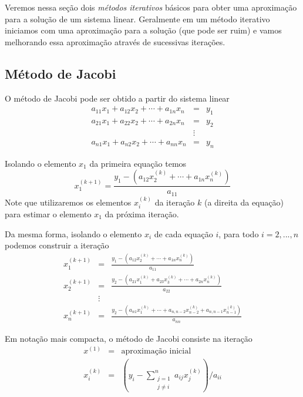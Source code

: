 Veremos nessa seção dois \emph{métodos iterativos} básicos para obter uma aproximação para a solução de um sistema linear. Geralmente em um método iterativo iniciamos com uma aproximação para a solução (que pode ser ruim) e vamos melhorando essa aproximação através de sucessivas iterações.




\subsection{Método de Jacobi}
O método de Jacobi pode ser obtido a partir do sistema linear
\begin{eqnarray*}
a_{11}x_1+a_{12}x_2+\cdots+a_{1n}x_n&=&y_1\\
a_{21}x_1+a_{22}x_2+\cdots+a_{2n}x_n&=&y_2\\
&\vdots&     \\
a_{n1}x_1+a_{n2}x_2+\cdots+a_{nn}x_n&=& y_n
\end{eqnarray*}

Isolando o elemento $x_1$ da primeira equação temos
\begin{equation}
x_1^{(k+1)}= \frac{y_1 - \left(a_{12}x_2^{(k)}+\cdots+a_{1n}x_n^{(k)}\right)}{a_{11}} 
\end{equation}
Note que utilizaremos os elementos $x_i^{(k)}$ da iteração $k$ (a direita da equação) para estimar o elemento $x_1$ da próxima iteração. 

Da mesma forma, isolando o elemento $x_i$ de cada equação $i$, para todo $i=2,...,n$ podemos construir a iteração
\begin{eqnarray*}
x_1^{(k+1)}&=&\frac{y_1 - \left(a_{12}x_2^{(k)}+\cdots+a_{1n}x_n^{(k)}\right)}{a_{11}}\\
x_2^{(k+1)}&=&\frac{y_2 - \left(a_{21}x_1^{(k)}+a_{23}x_3^{(k)}+\cdots+a_{2n}x_n^{(k)}\right)}{a_{22}}\\
&\vdots&\\
x_n^{(k+1)}&=&\frac{y_2 - \left(a_{n1}x_1^{(k)}+\cdots+a_{n,n-2}x_{n-2}^{(k)}+a_{n,n-1}x_{n-1}^{(k)}\right)}{a_{nn}}
\end{eqnarray*}

Em notação mais compacta, o método de Jacobi consiste na iteração
\begin{eqnarray*}
  x^{(1)}   &=& \text{aproximação inicial}\\
  x_i^{(k)} &=& \left(y_i - \sum_{\substack{j=1\\j\ne i}}^{n} a_{ij}x_j^{(k)} \right)/{a_{ii}}
\end{eqnarray*}

